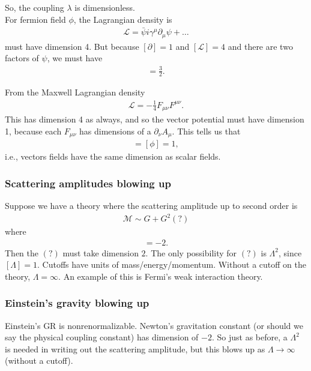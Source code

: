 \documentclass{book}
\theoremstyle{definition}
\newcommand{\p}{\partial}
\newcommand{\lag}{\mathcal{L}}
\newcommand{\f}[2]{\frac{#1}{#2}}
\begin{document}
So, the coupling $\lambda$ is dimensionless. \\


For fermion field $\phi$, the Lagrangian density is
\begin{align}
\lag = \bar{\psi} i \gamma^\mu \p_\mu \psi + \dots
\end{align}
must have dimension 4. But because $[\p] = 1$ and $[\lag] = 4$ and there are two factors of $\psi$, we must have
\begin{align}
[\psi] = \f{3}{2}.
\end{align} 


From the Maxwell Lagrangian density
\begin{align}
\lag = -\f{1}{4}F_{\mu\nu}F^{\mu\nu}.
\end{align}
This has dimension 4 as always, and so the vector potential must have dimension 1, because each $F_{\mu\nu}$ has dimensions of a $\p_\nu A_\mu$. This tells us that
\begin{align}
[A_\mu] = [\phi] = 1,
\end{align}
i.e., vectors fields have the same dimension as scalar fields.



\subsubsection{Scattering amplitudes blowing up}


Suppose we have a theory where the scattering amplitude up to second order is
\begin{align}
\mathcal{M} \sim G + G^2(?)
\end{align}
where
\begin{align}
[G] = -2.
\end{align}
Then the $(?)$ must take dimension $2$. The only possibility for $(?)$ is $\Lambda^2$, since $[\Lambda] = 1$. Cutoffs have units of mass/energy/momentum. Without a cutoff on the theory, $\Lambda = \infty$. An example of this is Fermi's weak interaction theory.



\subsubsection{Einstein's gravity blowing up}


Einstein's GR is nonrenormalizable. Newton's gravitation constant (or should we say the physical coupling constant) has dimension of $-2$. So just as before, a $\Lambda^2$ is needed in writing out the scattering amplitude, but this blows up as $\Lambda \to \infty$ (without a cutoff). 
\end{document}
